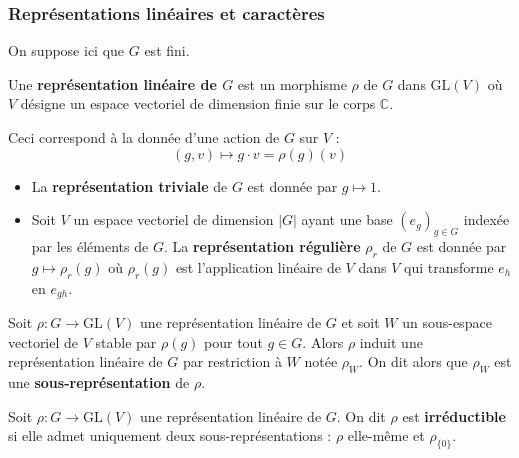 	\subsubsection{Représentations linéaires et caractères}
	
	On suppose ici que $G$ est fini.
	
	
	\begin{definition}
		Une \textbf{représentation linéaire de $G$} est un morphisme $\rho$ de $G$ dans $\mathrm{GL}(V)$ où $V$ désigne un espace vectoriel de dimension finie sur le corps $\mathbb{C}$.
	\end{definition}

	
	\begin{remark}
		Ceci correspond à la donnée d'une action de $G$ sur $V$ :
		\[ (g, v) \mapsto g \cdot v = \rho(g)(v) \]
	\end{remark}


	\begin{example}
		\begin{itemize}
			\item La \textbf{représentation triviale} de $G$ est donnée par $g \mapsto 1$.
			\item Soit $V$ un espace vectoriel de dimension $|G|$ ayant une base $(e_g)_{g \in G}$ indexée par les éléments de $G$. La \textbf{représentation régulière} $\rho_r$ de $G$ est donnée par $g \mapsto \rho_r(g)$ où $\rho_r(g)$ est l'application linéaire de $V$ dans $V$ qui transforme $e_h$ en $e_{gh}$.
		\end{itemize}
	\end{example}

	\begin{definition}
		Soit $\rho : G \rightarrow \mathrm{GL}(V)$ une représentation linéaire de $G$ et soit $W$ un sous-espace vectoriel de $V$ stable par $\rho(g)$ pour tout $g \in G$. Alors $\rho$ induit une représentation linéaire de $G$ par restriction à $W$ notée $\rho_W$. On dit alors que $\rho_W$ est une \textbf{sous-représentation} de $\rho$.
	\end{definition}

	
	\begin{definition}
		Soit $\rho : G \rightarrow \mathrm{GL}(V)$ une représentation linéaire de $G$. On dit $\rho$ est \textbf{irréductible} si elle admet uniquement deux sous-représentations : $\rho$ elle-même et $\rho_{\{ 0 \}}$.
	\end{definition}

